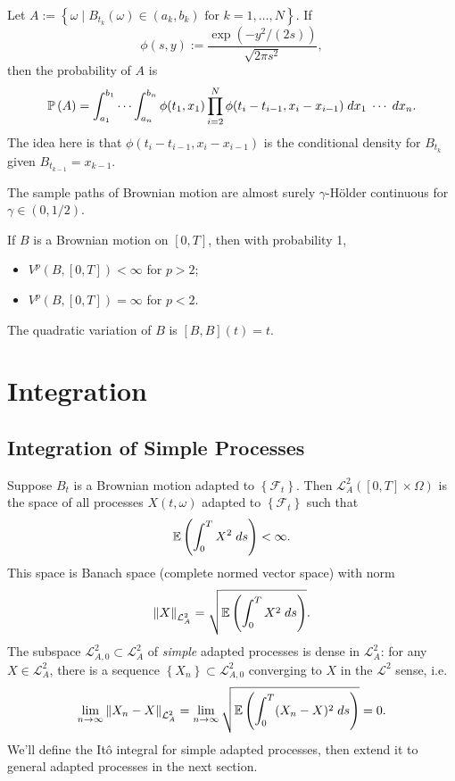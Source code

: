 \documentclass[twoside,10pt]{report}
\begin{document}

Let $ A := \left\{ \omega \;|\; B_{t_k}(\omega) \in (a_{k},b_{k}) \text{ for } k=1,\dots,N \right\}$. If
\[
\phi(s,y) := \frac{\exp\left( -y^2/(2s) \right)}{\sqrt{2 \pi s^2} } ,
\] then the probability of $A$ is
\[
\P{ A } = \int_{a_1}^{b_1} \cdots \int_{a_n}^{b_n} \phi(t_1, x_1) \prod_{i=2}^{N} \phi(t_{i}-t_{i-1},x_{i}-x_{i-1}) \; dx_1\;\cdots\; dx_{n}.
\] The idea here is that $\phi(t_{i}-t_{i-1},x_{i}-x_{i-1})$ is the conditional density for $B_{t_k}$ given $B_{t_{k-1}}=x_{k-1}$.

\begin{prop}
	The sample paths of Brownian motion are almost surely $\gamma$-H\"older continuous for $\gamma \in (0,1/2)$.
\end{prop}

\begin{prop}
If $B$ is a Brownian motion on $[0,T]$, then with probability 1,
\begin{itemize}
	\item $V^{p}(B,[0,T]) < \infty$ for $p>2$;
	\item $V^{p}(B,[0,T]) = \infty$ for $p<2$.
\end{itemize}
The quadratic variation of $B$ is $[B,B](t) = t$.
\end{prop}


\chapter{Integration}

\section{Integration of Simple Processes}

Suppose $B_{t}$ is a Brownian motion adapted to $\left\{ \mathcal{F}_{t} \right\}$. Then $\mathcal{L}_{A}^2([0,T] \times \Omega)$ is the space of all processes $X(t,\omega)$ adapted to $\left\{ \mathcal{F}_{t} \right\}$ such that
\[
\E{ \int_{0}^{T} X^2\;ds }< \infty.
\] This space is Banach space (complete normed vector space) with norm
\[
{\Vert{X}\Vert}_{\mathcal{L}_{A}^2} = \sqrt{\E{ \int_{0}^{T} X^2\;ds }} .
\] 
The subspace $\mathcal{L}_{A,0}^2 \subset \mathcal{L}_{A}^2$ of \emph{simple} adapted processes is dense in $\mathcal{L}_{A}^2$: for any $X \in \mathcal{L}_{A}^2$, there is a sequence $\left\{ X_{n} \right\} \subset \mathcal{L}_{A,0}^2$ converging to $X$ in the $\mathcal{L}^2$ sense, i.e.
\[
\lim_{n \to \infty} {\Vert{X_{n}-X}\Vert}_{\mathcal{L}_{A}^2} = \lim_{n \to \infty} \sqrt{\E{ \int_{0}^{T} (X_{n}-X)^2\;ds }} =0.
\] 
We'll define the It\^o integral for simple adapted processes, then extend it to general adapted processes in the next section.
\end{document}
